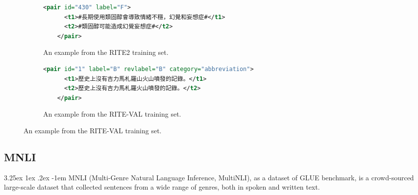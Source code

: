 \documentclass[12pt]{article}
\makeatletter
\renewcommand\paragraph{\@startsection{paragraph}{5}{\z@}%
  {3.25ex \@plus1ex \@minus.2ex}%
  {-1em}%
  {\normalfont\normalsize\bfseries}}
\makeatother
\begin{document}
\begin{CJK*}{UTF8}{bkai}
\begin{spacing}{1.77}

\begin{figure}[ht!]
  \centering
  \caption{The examples of RITE2 and RITE-VAL.}
  \begin{subfigure}{1\linewidth}
    \caption{An example from the RITE2 training set.}
  \begin{minipage}{\linewidth}
  \begin{lstlisting}[language=XML]
    <pair id="430" label="F">
      <t1>#長期使用類固醇會導致情緒不穩，幻覺和妄想症#</t1>
      <t2>#類固醇可能造成幻覺妄想症#</t2>
    </pair>
  \end{lstlisting}
  \end{minipage}
  \end{subfigure}

  \begin{subfigure}{1\linewidth}
    \caption{An example from the RITE-VAL training set.}
    \begin{minipage}{\linewidth}
    \begin{lstlisting}[language=XML]
    <pair id="1" label="B" revlabel="B" category="abbreviation">
      <t1>歷史上沒有吉力馬札羅山火山噴發的記錄。</t1>
      <t2>歷史上沒有吉力馬札羅火山噴發的記錄。</t2>
    </pair>
    \end{lstlisting}
    \end{minipage}
  \end{subfigure}
  \label{fig:rite_example}
\end{figure}

\subsection{MNLI}
\paragraph{}
MNLI (Multi-Genre Natural Language Inference, MultiNLI), as a dataset of GLUE benchmark, is a crowd-sourced large-scale dataset that collected sentences from a wide range of genres, both in spoken and written text.


\end{spacing}
\end{CJK*}
\end{document}
